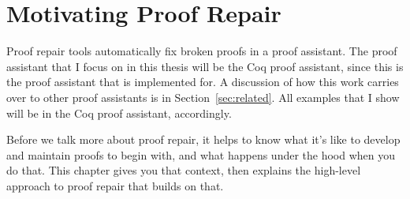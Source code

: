 \chapter{Motivating Proof Repair}

Proof repair tools automatically fix broken proofs in a proof assistant.
The proof assistant that I focus on in this thesis will be the Coq proof assistant,
since this is the proof assistant that \sysname is implemented for.
A discussion of how this work carries over to other proof assistants is in Section~\ref{sec:related}.
All examples that I show will be in the Coq proof assistant, accordingly.


Before we talk more about proof repair, it helps to know what it's like to develop and maintain proofs to begin with, and what happens under the hood when you do that. This chapter gives you that context, then explains the high-level approach to proof repair that builds on that.








